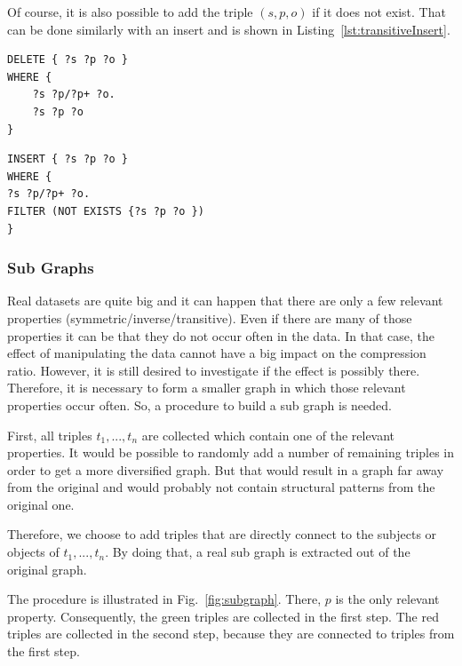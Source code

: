 Of course, it is also possible to add the triple $(s,p,o)$ if it does not exist. That can be done similarly with an insert and is shown in Listing~\ref{lst:transitiveInsert}.

\begin{lstlisting}[captionpos=b, caption=SPARQL update for removing triples with the transitive property p., label=lst:transitiveRemove,
basicstyle=\ttfamily,frame=single,float=hbt,]
DELETE { ?s ?p ?o }
WHERE { 
	?s ?p/?p+ ?o. 
	?s ?p ?o 
}
\end{lstlisting}


\begin{lstlisting}[captionpos=b, caption=SPARQL update for adding triples with the transitive property p., label=lst:transitiveInsert,
basicstyle=\ttfamily,frame=single,float=hbt,]
INSERT { ?s ?p ?o }
WHERE { 
?s ?p/?p+ ?o. 
FILTER (NOT EXISTS {?s ?p ?o })
}
\end{lstlisting}

\subsubsection{Sub Graphs}\label{sec:implementationSubGraphs}

Real datasets are quite big and it can happen that there are only a few relevant properties (symmetric/inverse/transitive). Even if there are many of those properties it can be that they do not occur often in the data. In that case, the effect of manipulating the data cannot have a big impact on the compression ratio. However, it is still desired to investigate if the effect is possibly there. Therefore, it is necessary to form a smaller graph in which those relevant properties occur often. So, a procedure to build a sub graph is needed.

First, all triples $t_1,...,t_n$ are collected which contain one of the relevant properties. It would be possible to randomly add a number of remaining triples in order to get a more diversified graph. But that would result in a graph far away from the original and would probably not contain structural patterns from the original one.

Therefore, we choose to add triples that are directly connect to the subjects or objects of $t_1,...,t_n$. By doing that, a real sub graph is extracted out of the original graph.

The procedure is illustrated in Fig.~\ref{fig:subgraph}. There, $p$ is the only relevant property. Consequently, the green triples are collected in the first step. The red triples are collected in the second step, because they are connected to triples from the first step.

